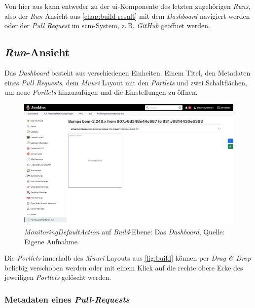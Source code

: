 Von hier aus kann entweder zu der \ac{ui}-Komponente des letzten zugehörigen \textit{Runs}, also der \textit{Run}-Ansicht aus \autoref{chap:build-result} mit dem \textit{Dashboard} navigiert werden oder der \textit{Pull Request} im \ac{scm}-System, z.\,B. \textit{GitHub} geöffnet werden.


\subsection{\textit{Run}-Ansicht}
\label{chap:build-result}

Das \textit{Dashboard} besteht aus verschiedenen Einheiten. Einem Titel, den Metadaten eines \textit{Pull Requests}, dem \textit{Muuri} Layout mit den \textit{Portlets} und zwei Schaltflächen, um neue \textit{Portlets} hinzuzufügen und die Einstellungen zu öffnen. 

\begin{figure}[h!]
\centering
\includegraphics[width=\textwidth]{source/images/build}
\caption[\textit{MonitoringDefaultAction} auf \textit{Run}-Ebene: Das \textit{Dashboard}.]{\textit{MonitoringDefaultAction} auf \textit{Build}-Ebene: Das \textit{Dashboard}, Quelle: Eigene Aufnahme.}
\label{fig:build}
\end{figure}

Die \textit{Portlets} innerhalb des \textit{Muuri} Layouts aus \autoref{fig:build} können per \textit{Drag \& Drop} beliebig verschoben werden oder mit einem Klick auf die rechte obere Ecke des jeweiligen \textit{Portlets} gelöscht werden.

\subsubsection{Metadaten eines \textit{Pull-Requests}}

